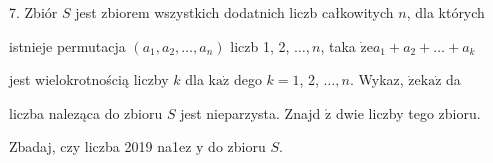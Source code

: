 \documentclass[a4paper,12pt]{article}
\begin{document}
7. Zbiór $S$ jest zbiorem wszystkich dodatnich liczb całkowitych $n$, dla których

istnieje permutacja $(a_{1},a_{2},\ldots,a_{n})$ liczb 1, 2, $\ldots, n$, taka $\dot{\mathrm{z}}\mathrm{e}a_{1}+a_{2}+\ldots+a_{k}$

jest wielokrotnością liczby $k$ dla $\mathrm{k}\mathrm{a}\dot{\mathrm{z}}$ dego $k=1$, 2, $\ldots, n$. Wykaz, $\dot{\mathrm{z}}\mathrm{e}\mathrm{k}\mathrm{a}\dot{\mathrm{z}}$ da

liczba naleząca do zbioru $S$ jest nieparzysta. Znajd $\acute{\mathrm{z}}$ dwie liczby tego zbioru.

Zbadaj, czy liczba 2019 na1ez $\mathrm{y}$ do zbioru $S.$
\end{document}
